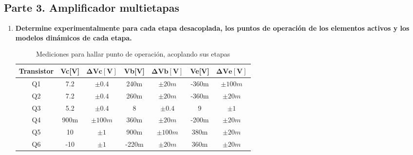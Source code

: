 \subsection{Parte 3. Amplificador multietapas} \label{subsec:parte3}

\begin{enumerate}

  \item \textbf{Determine experimentalmente para cada etapa desacoplada,
          los puntos de operación de los elementos activos y los modelos dinámicos de cada etapa.}

        \begin{table}[H]
          \centering
          \begin{tabular}{|c|c|c|c|c|c|c|}
            \hline
            \textbf{Transistor} & \textbf{Vc[V]} & $\mathbf{\Delta Vc[V]}$ & \textbf{Vb[V]} & $\mathbf{\Delta Vb[V]}$ & \textbf{Ve[V]} & $\mathbf{\Delta Ve[V]}$ \\ \hline
            Q1                  & 7.2            & $\pm 0.4$               & 240m           & $\pm 20m$               & -360m          & $\pm 100m$              \\ \hline
            Q2                  & 7.2            & $\pm 0.4$               & 260m           & $\pm 20m$               & -360m          & $\pm 20m$               \\ \hline
            Q3                  & 5.2            & $\pm 0.4$               & 8              & $\pm 0.4$               & 9              & $\pm 1$                 \\ \hline
            Q4                  & 900m           & $\pm 100m$              & 360m           & $\pm 20m$               & -200m          & $\pm 20m$               \\ \hline
            Q5                  & 10             & $\pm 1$                 & 900m           & $\pm 100m$              & 380m           & $\pm 20m$               \\ \hline
            Q6                  & -10            & $\pm 1$                 & -220m          & $\pm 20m$               & 360m           & $\pm 20m$               \\ \hline
          \end{tabular}
          \caption{Mediciones para hallar punto de operación, acoplando sus etapas}
          \label{tab:punto_operacion_aco}
        \end{table}




\end{enumerate}
